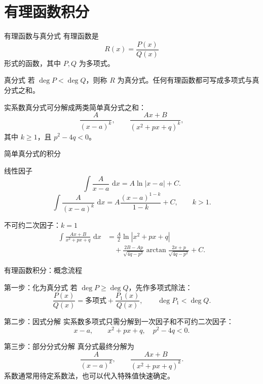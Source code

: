 \documentclass[aspectratio=169,10pt]{ctexbeamer}
\newcommand{\dd}{\,\mathrm{d}}
\begin{document}
\section{有理函数积分}

\begin{frame}[t]{有理函数与真分式}
\small
有理函数是
\[
  R(x)=\frac{P(x)}{Q(x)}
\]
形式的函数，其中 $P,Q$ 为多项式。

\begin{block}{真分式}
若 $\deg P<\deg Q$，则称 $R$ 为真分式。任何有理函数都可写成多项式与真分式之和。
\end{block}

实系数真分式可分解成两类简单真分式之和：
\[
  \frac{A}{(x-a)^k},\qquad
  \frac{Ax+B}{(x^2+px+q)^k},
\]
其中 $k\ge1$，且 $p^2-4q<0$。
\end{frame}

\begin{frame}[t]{简单真分式的积分}
\small
\begin{block}{线性因子}
\[
  \int\frac{A}{x-a}\,\dd x=A\ln|x-a|+C.
\]
\[
  \int\frac{A}{(x-a)^k}\,\dd x
  =A\frac{(x-a)^{1-k}}{1-k}+C,\qquad k>1.
\]
\end{block}

\begin{block}{不可约二次因子：$k=1$}
\[
\begin{aligned}
\int\frac{Ax+B}{x^2+px+q}\,\dd x
&=\frac A2\ln|x^2+px+q|\\
&\quad+\frac{2B-Ap}{\sqrt{4q-p^2}}
\arctan\frac{2x+p}{\sqrt{4q-p^2}}+C.
\end{aligned}
\]
\end{block}
\end{frame}

\begin{frame}[t,shrink=5]{有理函数积分：概念流程}
\small
\begin{block}{第一步：化为真分式}
若 $\deg P\ge\deg Q$，先作多项式除法：
\[
  \frac{P(x)}{Q(x)}=\text{多项式}+\frac{P_1(x)}{Q(x)},\qquad \deg P_1<\deg Q.
\]
\end{block}

\begin{block}{第二步：因式分解}
实系数多项式只需分解到一次因子和不可约二次因子：
\[
  x-a,\qquad x^2+px+q,\quad p^2-4q<0.
\]
\end{block}

\begin{block}{第三步：部分分式分解}
真分式最终分解为
\[
  \frac{A}{(x-a)^k},\qquad
  \frac{Ax+B}{(x^2+px+q)^k}.
\]
系数通常用待定系数法，也可以代入特殊值快速确定。
\end{block}
\end{frame}
\end{document}
